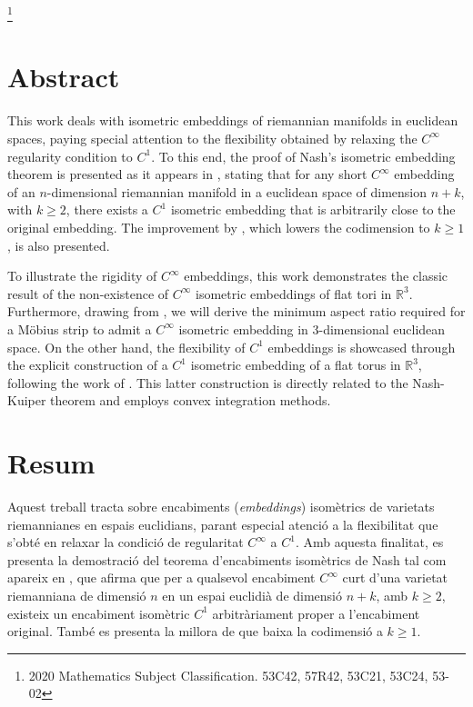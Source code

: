\documentclass[11pt,a4paper,openright,oneside]{book}
\numberwithin{equation}{section}
\theoremstyle{definition}
\begin{document}
\newpage
{} 
{\let\thefootnote\relax\footnote{2020 Mathematics Subject Classification. 53C42, 57R42, 53C21, 53C24, 53-02}} 
\section*{Abstract}
This work deals with isometric embeddings of riemannian manifolds in euclidean spaces, paying special attention to the flexibility obtained by relaxing the $C^\infty$ regularity condition to $C^1$. To this end, the proof of Nash's isometric embedding theorem is presented as it appears in \cite{nash1954}, stating that for any short $C^\infty$ embedding of an $n$-dimensional riemannian manifold in a euclidean space of dimension $n+k$, with $k \geq 2$, there exists a $C^1$ isometric embedding that is arbitrarily close to the original embedding. The improvement by \citet{kuiper1955}, which lowers the codimension to $k \geq 1$, is also presented.

To illustrate the rigidity of $C^\infty$ embeddings, this work demonstrates the classic result of the non-existence of $C^\infty$ isometric embeddings of flat tori in $\mathbb R^3$. Furthermore, drawing from \citet{schwartz2024}, we will derive the minimum aspect ratio required for a Möbius strip to admit a $C^\infty$ isometric embedding in 3-dimensional euclidean space. On the other hand, the flexibility of $C^1$ embeddings is showcased through the explicit construction of a $C^1$ isometric embedding of a flat torus in $\mathbb R^3$, following the work of \citet{borrelli2013}. This latter construction is directly related to the Nash-Kuiper theorem and employs convex integration methods.



\section*{Resum}
Aquest treball tracta sobre encabiments (\textit{embeddings}) isomètrics de varietats riemannianes en espais euclidians, parant especial atenció a la flexibilitat que s'obté en relaxar la condició de regularitat $C^\infty$ a $C^1$. Amb aquesta finalitat, es presenta la demostració del teorema d'encabiments isomètrics de Nash tal com apareix en \cite{nash1954}, que afirma que per a qualsevol encabiment $C^\infty$ curt d'una varietat riemanniana de dimensió $n$ en un espai euclidià de dimensió $n+k$, amb $k \geq 2$, existeix un encabiment isomètric $C^1$ arbitràriament proper a l'encabiment original. També es presenta la millora de \citet{kuiper1955} que baixa la codimensió a $k\ge1$. 
\end{document}

